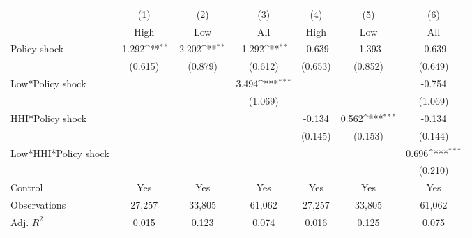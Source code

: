 {
\def\sym#1{\ifmmode^{#1}\else\(^{#1}\)\fi}
\begin{tabular*}{\hsize}{@{\hskip\tabcolsep\extracolsep\fill}l*{6}{c}}
\hline\hline
                    &\multicolumn{1}{c}{(1)}&\multicolumn{1}{c}{(2)}&\multicolumn{1}{c}{(3)}&\multicolumn{1}{c}{(4)}&\multicolumn{1}{c}{(5)}&\multicolumn{1}{c}{(6)}\\
                    &\multicolumn{1}{c}{High}&\multicolumn{1}{c}{Low}&\multicolumn{1}{c}{All}&\multicolumn{1}{c}{High}&\multicolumn{1}{c}{Low}&\multicolumn{1}{c}{All}\\
\hline
Policy shock        &      -1.292\sym{**} &       2.202\sym{**} &      -1.292\sym{**} &      -0.639         &      -1.393         &      -0.639         \\
                    &     (0.615)         &     (0.879)         &     (0.612)         &     (0.653)         &     (0.852)         &     (0.649)         \\
[1em]
Low*Policy shock    &                     &                     &       3.494\sym{***}&                     &                     &      -0.754         \\
                    &                     &                     &     (1.069)         &                     &                     &     (1.069)         \\
[1em]
HHI*Policy shock    &                     &                     &                     &      -0.134         &       0.562\sym{***}&      -0.134         \\
                    &                     &                     &                     &     (0.145)         &     (0.153)         &     (0.144)         \\
[1em]
Low*HHI*Policy shock&                     &                     &                     &                     &                     &       0.696\sym{***}\\
                    &                     &                     &                     &                     &                     &     (0.210)         \\
\hline
Control             &         Yes         &         Yes         &         Yes         &         Yes         &         Yes         &         Yes         \\
Observations        &      27,257         &      33,805         &      61,062         &      27,257         &      33,805         &      61,062         \\
Adj. $ R^2$         &       0.015         &       0.123         &       0.074         &       0.016         &       0.125         &       0.075         \\
\hline\hline
\end{tabular*}
}

